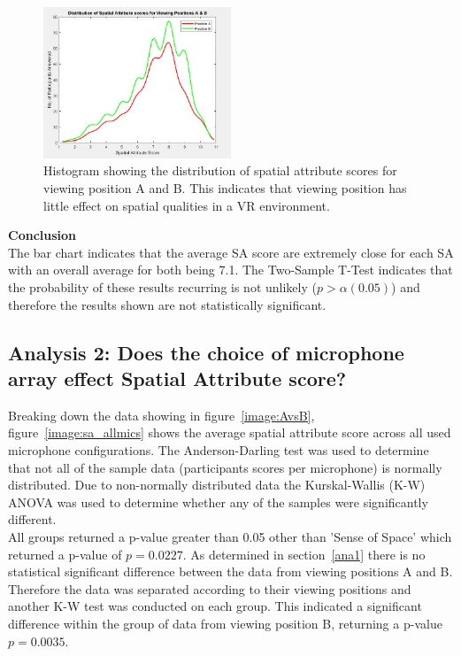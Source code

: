 		\begin{figure}
			\includegraphics[width=0.5\textwidth]{images/stats/AvsB_sa_stack_all.PNG}
			\caption{Histogram showing the distribution of spatial attribute scores for viewing position A and B. This indicates that viewing position has little effect on spatial qualities in a VR environment.}
			\label{image:AvsB_dist} 
		\end{figure}

		\textbf{Conclusion}\\

		The bar chart indicates that the average SA score are extremely close for each SA with an overall average for both being 7.1. The Two-Sample T-Test indicates that the probability of these results recurring is not unlikely ($p > \alpha (0.05)$) and therefore the results shown are not statistically significant.


	\subsection{Analysis 2: Does the choice of microphone array effect Spatial Attribute score?}
	\label{ana2}

		Breaking down the data showing in figure~\ref{image:AvsB}, figure~\ref{image:sa_allmics} shows the average spatial attribute score across all used microphone configurations. The Anderson-Darling test was used to determine that not all of the sample data (participants scores per microphone) is normally distributed. Due to non-normally distributed data the Kurskal-Wallis (K-W) ANOVA was used to determine whether any of the samples were significantly different. \\

		All groups returned a p-value greater than 0.05 other than 'Sense of Space' which returned a p-value of $p = 0.0227 $. As determined in section~\ref{ana1} there is no statistical significant difference between the data from viewing positions A and B. Therefore the data was separated according to their viewing positions and another K-W test was conducted on each group. This indicated a significant difference within the group of data from viewing position B, returning a p-value $ p = 0.0035 $.

